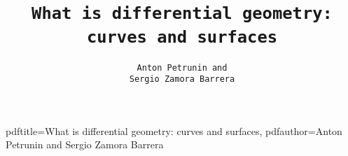 \hypersetup
{
pdftitle={What is differential geometry: curves and surfaces},
pdfauthor={Anton Petrunin and Sergio Zamora Barrera}
}

\title{\tt What is differential geometry:\\
curves and surfaces}

\author{\tt Anton Petrunin and \\ \tt Sergio Zamora Barrera}

\date{}

\maketitle

\thispagestyle{empty}
